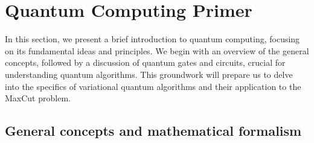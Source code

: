 


\section{Quantum Computing Primer}
\label{section:QC_Primer}

In this section, we present a brief introduction to quantum computing, focusing on its fundamental ideas and principles. We begin with an overview of the general concepts, followed by a discussion of quantum gates and circuits, crucial for understanding quantum algorithms. This groundwork will prepare us to delve into the specifics of variational quantum algorithms and their application to the MaxCut problem.





\subsection*{General concepts and mathematical formalism}

